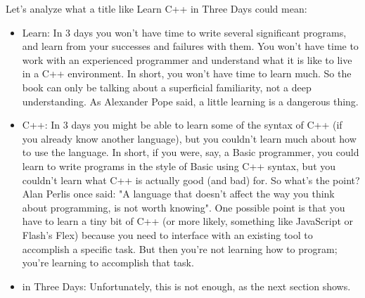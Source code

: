 \documentclass[12pt,a4paper,final,twoside,onecolumn,titlepage]{book}
\begin{document}
Let's analyze what a title like Learn C++ in Three Days could mean:
\begin{itemize}
\item Learn: In 3 days you won't have time to write several significant programs, and learn from your successes and failures with them. You won't have time to work with an experienced programmer and understand what it is like to live in a C++ environment. In short, you won't have time to learn much. So the book can only be talking about a superficial familiarity, not a deep understanding. As Alexander Pope said, a little learning is a dangerous thing.
\item C++: In 3 days you might be able to learn some of the syntax of C++ (if you already know another language), but you couldn't learn much about how to use the language. In short, if you were, say, a Basic programmer, you could learn to write programs in the style of Basic using C++ syntax, but you couldn't learn what C++ is actually good (and bad) for. So what's the point? Alan Perlis once said: "A language that doesn't affect the way you think about programming, is not worth knowing". One possible point is that you have to learn a tiny bit of C++ (or more likely, something like JavaScript or Flash's Flex) because you need to interface with an existing tool to accomplish a specific task. But then you're not learning how to program; you're learning to accomplish that task.
\item in Three Days: Unfortunately, this is not enough, as the next section shows.
\end{itemize}
\end{document}

